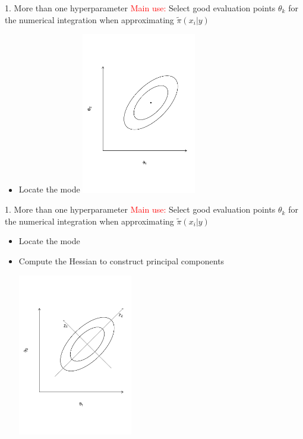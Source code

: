 \documentclass[
  ignorenonframetext,
]{beamer}
\providecommand{\tightlist}{%
  \setlength{\itemsep}{0pt}\setlength{\parskip}{0pt}}
\begin{document}
\begin{frame}{1. More than one hyperparameter}
\protect\hypertarget{more-than-one-hyperparameter}{}
\textcolor{red}{Main use:} Select good evaluation points \({\theta}_k\)
for the numerical integration when approximating
\(\widetilde{\pi}(x_i|{y})\)

\begin{itemize}
\tightlist
\item
  Locate the mode \includegraphics[width=5cm]{./graphics/ellipse1}
\end{itemize}
\end{frame}

\begin{frame}{1. More than one hyperparameter}
\protect\hypertarget{more-than-one-hyperparameter-1}{}
\textcolor{red}{Main use:} Select good evaluation points \({\theta}_k\)
for the numerical integration when approximating
\(\widetilde{\pi}(x_i|{y})\)

\begin{itemize}
\item
  Locate the mode
\item
  Compute the Hessian to construct principal components

  \includegraphics[width=5cm]{./graphics/ellipse2}
\end{itemize}
\end{frame}
\end{document}
